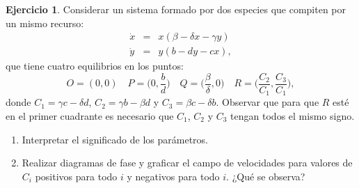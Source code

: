 \documentclass[12pt, a4paper]{amsbook}
\theoremstyle{remark}
\theoremstyle{definition}
\newtheorem{ejer}[teo]{Ejercicio}
\numberwithin{section}{chapter}
\numberwithin{subsection}{section}
\numberwithin{equation}{section}
\numberwithin{figure}{chapter}
\begin{document}
\begin{ejer} Considerar un sistema formado por dos especies que compiten por un mismo recurso:
$$\begin{array}{rcl}
\dot{x} &=& x(\beta-\delta x-\gamma y)\\ 
\dot{y} &=& y(b-dy-cx),
\end{array}$$
que tiene cuatro equilibrios en los puntos: 
\[O=(0,0)\quad P=\Big(0,\frac{b}{d}\Big)\quad Q=\Big(\frac{\beta}{\delta},0\Big) \quad R=\Big(\frac{C_2}{C_1},\frac{C_3}{C_1}\Big),\]
donde $C_1 = \gamma c-\delta d$, $C_2=\gamma b-\beta d$ y $C_3=\beta c-\delta b$. 
Observar que para que $R$ esté en el primer cuadrante es necesario que $C_1$, $C_2$ y $C_3$ tengan todos el mismo signo. 
\begin{enumerate}
\item Interpretar el significado de los parámetros. 
\item Realizar diagramas de fase y graficar el campo de velocidades para valores de $C_i$ positivos para todo $i$ y negativos para todo $i$. ¿Qué se observa? 
\end{enumerate}
\end{ejer}
\end{document}
